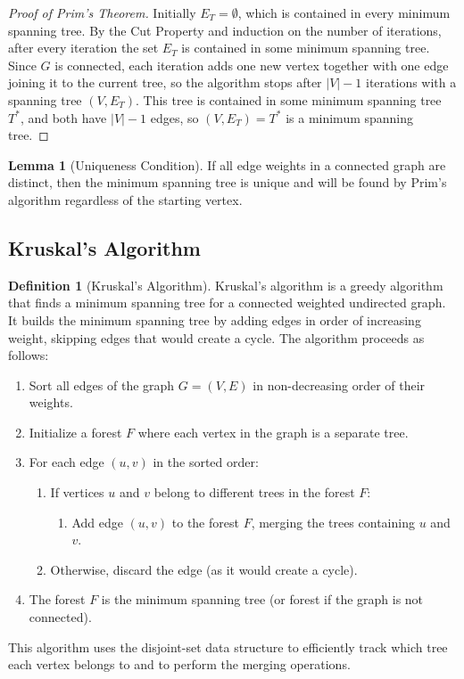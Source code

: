 \documentclass{article}
\theoremstyle{definition}
\newtheorem{lemma}{Lemma}
\newtheorem{definition}{Definition}
\begin{document}
\begin{proof}[Proof of Prim's Theorem]
Initially $E_T = \emptyset$, which is contained in every minimum spanning tree. By the Cut Property and induction on the number of iterations, after every iteration the set $E_T$ is contained in some minimum spanning tree. Since $G$ is connected, each iteration adds one new vertex together with one edge joining it to the current tree, so the algorithm stops after $|V| - 1$ iterations with a spanning tree $(V, E_T)$. This tree is contained in some minimum spanning tree $T^*$, and both have $|V| - 1$ edges, so $(V, E_T) = T^*$ is a minimum spanning tree.
\end{proof}

\begin{lemma}[Uniqueness Condition]
If all edge weights in a connected graph are distinct, then the minimum spanning tree is unique and will be found by Prim's algorithm regardless of the starting vertex.
\end{lemma}

\pagebreak

\subsection{Kruskal's Algorithm}\label{subsec:kruskal}

\begin{definition}[Kruskal's Algorithm]
Kruskal's algorithm is a greedy algorithm that finds a minimum spanning tree for a connected weighted undirected graph. It builds the minimum spanning tree by adding edges in order of increasing weight, skipping edges that would create a cycle. The algorithm proceeds as follows:
\begin{enumerate}
\item Sort all edges of the graph $G = (V, E)$ in non-decreasing order of their weights.
\item Initialize a forest $F$ where each vertex in the graph is a separate tree.
\item For each edge $(u,v)$ in the sorted order:
   \begin{enumerate}
   \item If vertices $u$ and $v$ belong to different trees in the forest $F$:
      \begin{enumerate}
      \item Add edge $(u,v)$ to the forest $F$, merging the trees containing $u$ and $v$.
      \end{enumerate}
   \item Otherwise, discard the edge (as it would create a cycle).
   \end{enumerate}
\item The forest $F$ is the minimum spanning tree (or forest if the graph is not connected).
\end{enumerate}
This algorithm uses the disjoint-set data structure to efficiently track which tree each vertex belongs to and to perform the merging operations.
\end{definition}
\end{document}
